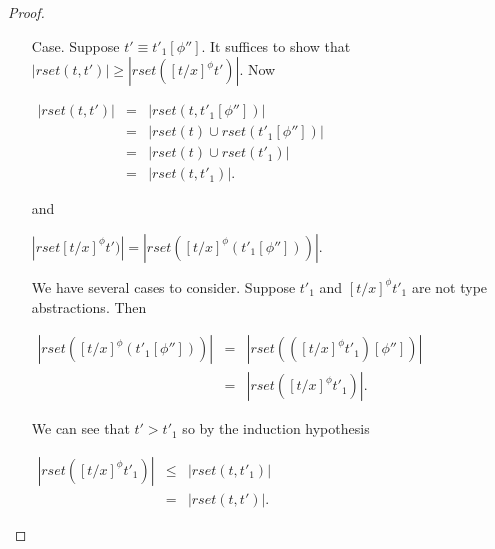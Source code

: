 \begin{proof}
\begin{itemize}
\item[Case.] Suppose $t' \equiv t'_1[\phi'']$.  It suffices to show that 
  $|rset(t,t')| \geq |rset([t/x]^\phi t')|$.  Now 
  \begin{center}
    \begin{math}
      \begin{array}{lll}
        |rset(t,t')| & = & |rset(t,t'_1[\phi''])|\\
        & = & |rset(t) \cup rset(t'_1[\phi''])|\\
        & = & |rset(t) \cup rset(t'_1)|\\
        & = & |rset(t,t'_1)|.
      \end{array}
    \end{math}
  \end{center}
  and
  \begin{center}
    $|rset[t/x]^\phi t')| = |rset([t/x]^\phi(t'_1[\phi'']))|$.
  \end{center}
  We have several cases to consider.  Suppose $t'_1$ and $[t/x]^\phi t'_1$ are not type abstractions.
  Then 
  \begin{center}
    \begin{math}
      \begin{array}{lll}
        |rset([t/x]^\phi(t'_1[\phi'']))| & = & |rset(([t/x]^\phi t'_1)[\phi''])|\\
        & = & |rset([t/x]^\phi t'_1)|.
      \end{array}
    \end{math}
  \end{center}
  We can see that $t' > t'_1$ so by the induction hypothesis 
  \begin{center}
    \begin{math}
      \begin{array}{lll}
        |rset([t/x]^\phi t'_1)| & \leq & |rset(t,t'_1)|\\
        & = & |rset(t,t')|.
      \end{array}
    \end{math}
  \end{center}
  

\end{itemize}
\end{proof}
